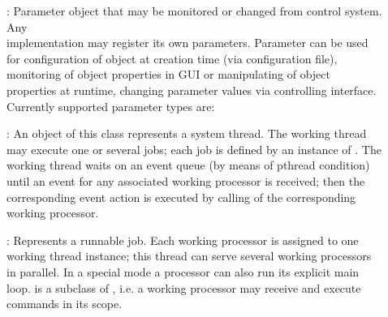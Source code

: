 \begin{description}
\item[] :   
Parameter object that may be monitored or 
   changed from control system. Any \\
    implementation 
   may register its own parameters. Parameter can be used for configuration of object 
   at creation time (via configuration file), monitoring of object properties in GUI or
   manipulating of object properties at runtime, changing parameter values via controlling 
   interface.  Currently supported parameter types are:

\item[] :  
An object of this class represents a system thread. 
   The working thread may execute one or several jobs; each job is defined 
   by an instance of . The working thread waits on an 
   event queue (by means of pthread condition) until an event for any 
   associated working processor is received; then the corresponding event action is 
   executed by calling  of the corresponding working processor.

\item[] :   
   Represents a runnable job. Each 
   working processor is assigned to one working thread instance; 
   this thread can serve several working processors in parallel.
   In a special mode a processor can also run its explicit main loop.  
    is a subclass of , 
   i.e. a working processor may receive and execute commands in its scope. 


\end{description}
